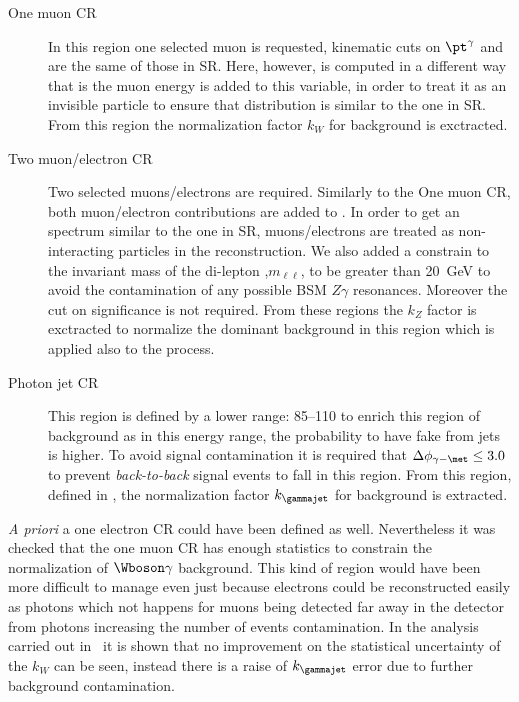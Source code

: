 \begin{description}
\item [One muon CR] In this region one selected muon is requested, kinematic cuts on $\pt^\gamma$ and \met are the same of those in SR. Here, however, \met is computed in a different way that is the muon energy is added to this variable, in order to treat it as an invisible particle to ensure that \met distribution is similar to the one in SR. From this region the normalization factor $k_W$ for \wg background is exctracted.
\item [Two muon/electron CR] Two selected muons/electrons are required. Similarly to the One muon CR, both muon/electron contributions are added to \met. In order to get an \met spectrum similar to the one in SR, muons/electrons are treated as non-interacting particles in the \met reconstruction.  We also added a constrain to the invariant mass of the di-lepton ,$m_{\ell\ell}$, to be greater than \SI{20}{\GeV} to avoid the contamination of any possible BSM $Z\gamma$ resonances. Moreover the cut on \met significance is not required. From these regions the $k_Z$ factor is exctracted to normalize the dominant background \zg in this region which is applied also to the \znng process.
\item [Photon jet CR] This region is defined by a lower \met range: \SIrange{85}{110}{\gev} to enrich this region of \gj background as in this energy range, the probability to have fake \met from jets is higher. To avoid signal contamination it is required that $\Delta\phi_{\gamma - \met} \le 3.0$ to prevent {\itshape back-to-back} signal events to fall in this region. From this region, defined in \RunTwo, the normalization factor $k_\gammajet$ for \gj background is extracted.
\end{description}

{\itshape A priori} a one electron CR could have been defined as well. Nevertheless it was checked that the one muon CR has enough statistics to constrain the normalization of $\Wboson\gamma$ background.  This kind of region would have been more difficult to manage even just because electrons could be reconstructed easily as photons which not happens for muons being detected far away in the detector from photons increasing the number of \gj events contamination. In the \mph analysis carried out in~\cite{paperMP} it is shown that no improvement on the statistical uncertainty of the $k_W$ can be seen, instead there is a raise of $k_{\gammajet}$ error due to further background contamination.


